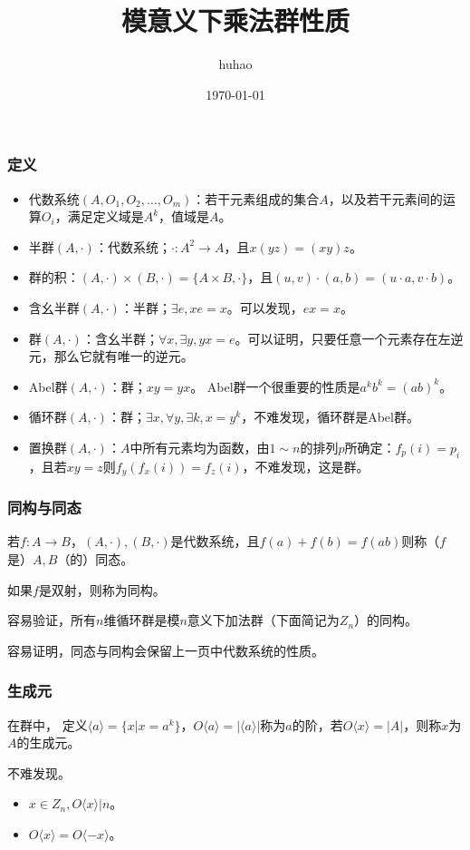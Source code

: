 \documentclass[10pt]{beamer}
\begin{document}
	\title{模意义下乘法群性质}
	\date{\today}
	\author{huhao}
	\maketitle
	\clearpage
	\begin{frame}
		\frametitle{定义}
	
		\begin{itemize}
			\item 代数系统$(A,O_1,O_2,\dots,O_m)$：若干元素组成的集合$A$，以及若干元素间的运算$O_i$，满足定义域是$A^k$，值域是$A$。
			\item 半群$(A,\cdot)$：代数系统；$\cdot:A^2\rightarrow A$，且$x(yz)=(xy)z$。
			\item 群的积：$(A,\cdot)\times(B,\cdot)=\{A\times B,\cdot\}$，且$(u,v)\cdot(a,b)=(u\cdot a,v\cdot b)$。
			\item 含幺半群$(A,\cdot)$：半群；$\exists e,xe=x$。可以发现，$ex=x$。
			\item 群$(A,\cdot)$：含幺半群；$\forall x,\exists y,yx=e$。可以证明，只要任意一个元素存在左逆元，那么它就有唯一的逆元。
			\item Abel群$(A,\cdot)$：群；$xy=yx$。 Abel群一个很重要的性质是$a^kb^k=(ab)^k$。
			\item 循环群$(A,\cdot)$：群；$\exists x,\forall y,\exists k,x=y^k$，不难发现，循环群是Abel群。
			\item 置换群$(A,\cdot)$：$A$中所有元素均为函数，由$1\sim n$的排列$p$所确定：$f_p(i)=p_i$，且若$xy=z$则$f_y(f_x(i))=f_z(i)$，不难发现，这是群。
		\end{itemize}

	\end{frame}
	\begin{frame}
		\frametitle{同构与同态}
	
		若$f:A\rightarrow B$，$(A,\cdot),(B,\cdot)$是代数系统，且$f(a)+f(b)=f(ab)$则称（$f$是）$A,B$（的）同态。

		如果$f$是双射，则称为同构。

		容易验证，所有$n$维循环群是模$n$意义下加法群（下面简记为$Z_n$）的同构。

		容易证明，同态与同构会保留上一页中代数系统的性质。
	
	\end{frame}
	\begin{frame}
		\frametitle{生成元}
	
		在群中， 定义$\langle a\rangle =\{x|x=a^k\}$，$O\langle a\rangle =|\langle a\rangle |$称为$a$的阶，若$O\langle x\rangle =|A|$，则称$x$为$A$的生成元。

		不难发现。
		
		\begin{itemize}
			\item $x\in Z_n,O\langle x\rangle |n$。
			\item $O\langle x\rangle =O\langle -x\rangle $。
		\end{itemize}
	\end{frame}
\end{document}
